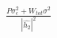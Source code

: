 \documentclass[preview]{standalone}
\begin{document}
\begin{align*}
\frac{P \sigma_\epsilon^2 + W_{tot} \sigma^2}{\left|\hat{h_2}\right|^2}
\end{align*}
\end{document}
